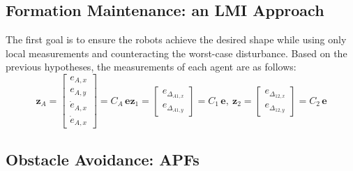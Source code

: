 \documentclass{ifacconf}
\begin{document}
\subsection{Formation Maintenance: an LMI Approach}
The first goal is to ensure the robots achieve the desired shape 
while using only local measurements 
and counteracting the worst-case disturbance.
Based on the previous hypotheses, the measurements of 
each agent are as follows:
\begin{subequations}
    \begin{equation}
    \boldsymbol{z}_A = \begin{bmatrix}
        e_{A,x}  \\ e_{A,y} \\ \dot{e}_{A,x} \\ \dot{e}_{A,x}
    \end{bmatrix}= C_A \, \boldsymbol{e}
\end{equation}
\begin{equation}
    \boldsymbol{z}_1 = \begin{bmatrix}
        e_{\Delta_{A1,x}} \\ e_{\Delta_{A1,y}}
    \end{bmatrix} = C_1 \, \boldsymbol{e}, \  
     \boldsymbol{z}_2 = \begin{bmatrix}
        e_{\Delta_{12,x}} \\ e_{\Delta_{12,y}}
    \end{bmatrix} = C_2 \, \boldsymbol{e}
\end{equation}
\label{eq:airground-continous_time-measurement}
\end{subequations}


\subsection{Obstacle Avoidance: APFs}
\end{document}
